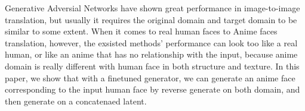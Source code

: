 ﻿\par
Generative Adversial Networks have shown great 
performance in image-to-image translation, but usually it 
requires the original domain and target domain to be similar 
to some extent. When it comes to real human faces to Anime 
faces translation, however, the exsisted methods' performance
 can look too like a real human, or like an anime that
  has no relationship with the input, because anime domain is really different with 
  human face in both structure and texture. In this paper, we 
  show that with a finetuned generator, we can generate an anime face corresponding
  to the input human face by reverse generate on both domain, and then generate on a concatenaed latent.
